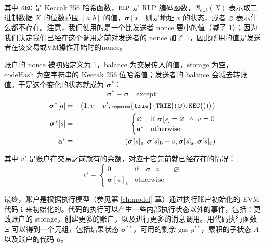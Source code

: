 \documentclass[9pt,oneside]{amsart}
\begin{document}
\begin{multicols}{2}
其中 $\mathtt{\tiny KEC}$ 是 Keccak 256 哈希函数，$\mathtt{\tiny RLP}$ 是 RLP 编码函数，$\mathcal{B}_{a..b}(X)$ 表示取二进制数据 $X$ 的位数范围 $[a, b]$ 的值，$\boldsymbol{\sigma}[x]$ 则是地址 $x$ 的状态，或者 $\varnothing$ 表示什么都不存在。注意，我们使用的是一个比发送者 nonce 要小的值（减了 1）；因为我们认定我们已经在这个调用之前对发送者的 nonce 加了 1，因此所用的值是发送者在该交易或VM操作开始时的nonce。

账户的 nonce 被初始定义为 1，balance 为交易传入的值，storage 为空，codeHash 为空字符串的 Keccak 256 位哈希值；发送者的 balance 会减去转账值。于是这个变化的状态就成为 $\boldsymbol{\sigma}^*$：
\begin{equation}
\boldsymbol{\sigma}^* \equiv \boldsymbol{\sigma} \quad \text{except:}
\end{equation}
\begin{eqnarray}
\boldsymbol{\sigma}^*[a] &=& \big( 1, v + v', \mathtt{\tiny \hyperlink{trie}{TRIE}}(\varnothing), \mathtt{\tiny KEC}\big(()\big) \big) \\
\boldsymbol{\sigma}^*[s] &=& \begin{cases}
\varnothing & \text{if}\ \boldsymbol{\sigma}[s] = \varnothing \ \wedge\ v = 0 \\
\mathbf{a}^* & \text{otherwise}
\end{cases} \\
\mathbf{a}^* &\equiv& (\boldsymbol{\sigma}[s]_{\mathrm{n}}, \boldsymbol{\sigma}[s]_{\mathrm{b}} - v, \boldsymbol{\sigma}[s]_{\mathbf{s}}, \boldsymbol{\sigma}[s]_{\mathrm{c}})
\end{eqnarray}

其中 $v'$ 是账户在交易之前就有的余额，对应于它先前就已经存在的情况：
\begin{equation}
v' \equiv \begin{cases}
0 & \text{if} \quad \boldsymbol{\sigma}[a] = \varnothing\\
\boldsymbol{\sigma}[a]_{\mathrm{b}} & \text{otherwise}
\end{cases}
\end{equation}


最终，账户是根据执行模型（参见第 \ref{ch:model} 章）通过执行账户初始化的 EVM 代码 $\mathbf{i}$ 来初始化的。代码的执行可以产生一些内部执行状态以外的事件，包括：更改账户的 storage，创建更多的账户，以及进行更多的消息调用。用代码执行函数 $\Xi$ 可以得到一个元组，包括结果状态 $\boldsymbol{\sigma}^{**}$，可用的剩余 gas $g^{**}$，累积的子状态 $A$ 以及账户的代码 $\mathbf{o}$。


\end{multicols}
\end{document}
